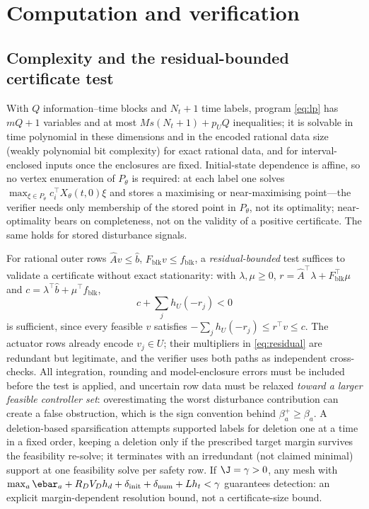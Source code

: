 \section{Computation and verification}\label{sec:computation}

\subsection{Complexity and the residual-bounded certificate test}

With $Q$ information--time blocks and $N_t+1$ time labels, program \eqref{eq:lp} has $mQ+1$ variables and at most $Ms(N_t{+}1)+p_UQ$ inequalities; it is solvable in time polynomial in these dimensions and in the encoded rational data size (weakly polynomial bit complexity) for exact rational data, and for interval-enclosed inputs once the enclosures are fixed. Initial-state dependence is affine, so no vertex enumeration of $P_\theta$ is required: at each label one solves $\max_{\xi\in P_\theta}c_i^\top X_\theta(t,0)\xi$ and stores a maximising or near-maximising point---the verifier needs only membership of the stored point in $P_\theta$, not its optimality; near-optimality bears on completeness, not on the validity of a positive certificate. The same holds for stored disturbance signals.

For rational outer rows $\widehat Av\le\widehat b$, $F_{\mathrm{blk}}v\le f_{\mathrm{blk}}$, a \emph{residual-bounded} test suffices to validate a certificate without exact stationarity: with $\lambda,\mu\ge0$, $r=\widehat A^\top\lambda+F_{\mathrm{blk}}^\top\mu$ and $c=\lambda^\top\widehat b+\mu^\top f_{\mathrm{blk}}$,
\begin{equation}\label{eq:residual}
c+\sum_jh_U(-r_j)<0
\end{equation}
is sufficient, since every feasible $v$ satisfies $-\sum_jh_U(-r_j)\le r^\top v\le c$. The actuator rows already encode $v_j\in U$; their multipliers in \eqref{eq:residual} are redundant but legitimate, and the verifier uses both paths as independent cross-checks. All integration, rounding and model-enclosure errors must be included before the test is applied, and uncertain row data must be relaxed \emph{toward a larger feasible controller set}: overestimating the worst disturbance contribution can create a false obstruction, which is the sign convention behind $\beta^+_a\ge\beta_a$. A deletion-based sparsification attempts supported labels for deletion one at a time in a fixed order, keeping a deletion only if the prescribed target margin survives the feasibility re-solve; it terminates with an irredundant (not claimed minimal) support at one feasibility solve per safety row. If $\J=\gamma>0$, any mesh with $\max_a\ebar_a+R_DV_Dh_d+\delta_{\mathrm{init}}+\delta_{\mathrm{num}}+Lh_t<\gamma$ guarantees detection: an explicit margin-dependent resolution bound, not a certificate-size bound.

